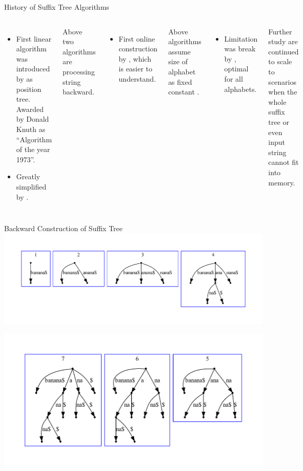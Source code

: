 \begin{frame}[shrink=5]{History of Suffix Tree Algorithms}
\begin{columns}
\begin{itemize}
\item First linear algorithm was introduced by \citealt{Wei73} as position
 tree. Awarded by Donald Knuth as ``Algorithm of the year 1973''.
\item Greatly simplified by \citealt{Mcc76}.
\end{itemize}

Above two algorithms are processing string \alert{backward}.

\begin{itemize}
\item First online construction by \citealt{Ukk95}, which is easier to understand.
\end{itemize}

Above algorithms assume size of \alert{alphabet as fixed} constant .

\begin{itemize}
\item Limitation was break by \citealt{farach97}, optimal for all alphabets.
\end{itemize}

Further study are continued to scale to scenarios when the whole suffix tree 
or even input string cannot fit into memory.
{
\tiny


}
\end{columns}
\end{frame}
\begin{frame}{Backward Construction of Suffix Tree}
\includegraphics[height=0.32\textheight,trim=40pt 40pt 40pt 40pt]{back-banana_0-3.pdf}

\includegraphics[height=0.52\textheight,trim=40pt 40pt 40pt 40pt]{back-banana_4-6.pdf}
\end{frame}


